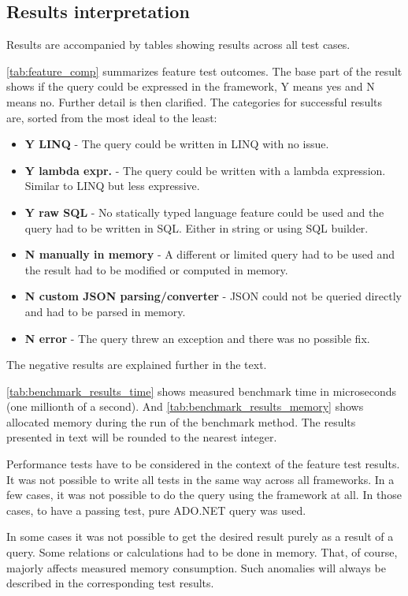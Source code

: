 \subsection{Results interpretation}
Results are accompanied by tables showing results across all test cases. 

\autoref{tab:feature_comp} summarizes feature test outcomes. The base part of the result shows if the query could be expressed in the framework, Y means yes and N means no. Further detail is then clarified. The categories for successful results are, sorted from the most ideal to the least:
\begin{itemize}
    \item \textbf{Y LINQ} - The query could be written in LINQ with no issue.
    \item \textbf{Y lambda expr.} - The query could be written with a lambda expression. Similar to LINQ but less expressive.
    \item \textbf{Y raw SQL} - No statically typed language feature could be used and the query had to be written in SQL. Either in string or using SQL builder.
    \item \textbf{N manually in memory} - A different or limited query had to be used and the result had to be modified or computed in memory.
    \item \textbf{N custom JSON parsing/converter} - JSON could not be queried directly and had to be parsed in memory.
    \item \textbf{N error} - The query threw an exception and there was no possible fix. 
\end{itemize}
The negative results are explained further in the text.

\autoref{tab:benchmark_results_time} shows measured benchmark time in microseconds (one millionth of a second). And \autoref{tab:benchmark_results_memory} shows allocated memory during the run of the benchmark method. The results presented in text will be rounded to the nearest integer.

Performance tests have to be considered in the context of the feature test results. It was not possible to write all tests in the same way across all frameworks. In a few cases, it was not possible to do the query using the framework at all. In those cases, to have a passing test, pure ADO.NET query was used. 

In some cases it was not possible to get the desired result purely as a result of a query. Some relations or calculations had to be done in memory. That, of course, majorly affects measured memory consumption. Such anomalies will always be described in the corresponding test results.

